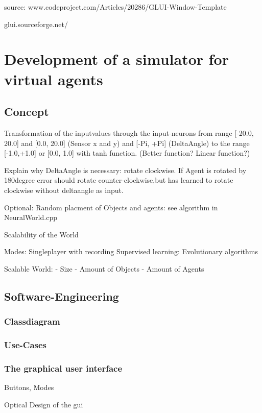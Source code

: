 \documentclass[10pt,a4paper,DIV=11]{scrreprt}
\begin{document}
source: www.codeproject.com/Articles/20286/GLUI-Window-Template

glui.sourceforge.net/

\chapter{Development of a simulator for virtual agents}

\section{Concept}


Transformation of the inputvalues through the input-neurons from range [-20.0, 20.0] and [0.0, 20.0] (Sensor x and y) and [-Pi, +Pi] (DeltaAngle) to the range [-1.0,+1.0] or [0.0, 1.0] with tanh function. (Better function? Linear function?)

Explain why DeltaAngle is necessary:
rotate clockwise. If Agent is rotated by 180degree error should rotate counter-clockwise,but
has learned to rotate clockwise without deltaangle as input.


Optional: Random placment of Objects and agents: see algorithm in NeuralWorld.cpp



Scalability of the World


Modes:
Singleplayer with recording
Supervised learning:
Evolutionary algorithms

Scalable World:
- Size
- Amount of Objects
- Amount of Agents

\section{Software-Engineering}

\subsection{Classdiagram}

\subsection{Use-Cases}

\subsection{The graphical user interface}

Buttons, Modes

Optical Design of the gui
\end{document}
